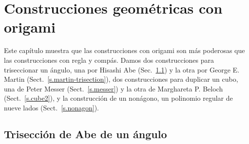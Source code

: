 
\chapter{Construcciones geométricas con origami}\label{c.origami-constructions}


Este capítulo muestra que las construcciones con origami son más poderosas que las construcciones con regla y compás. Damos dos construcciones para triseccionar un ángulo, una por Hisashi Abe (Sec.~\ref{s.abe-trisection}) y la otra por George E. Martin (Sect.~\ref{s.martin-trisection}), dos construcciones para duplicar un cubo, una de Peter Messer (Sect.~\ref{s.messer}) y la otra de Marghareta P. Beloch (Sect.~\ref{s.cube2}), y la construcción de un nonágono, un polinomio regular de nueve lados (Sect.~\ref{s.nonagon}).

\section{Trisección de Abe de un ángulo}\label{s.abe-trisection}

